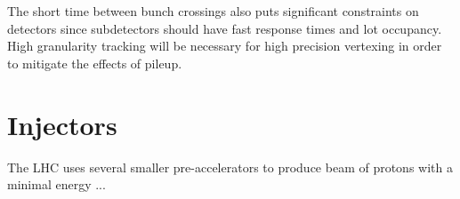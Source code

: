 The short time between bunch crossings also puts significant constraints on 
detectors since subdetectors should have fast response times and lot occupancy. 
High granularity tracking will be necessary for high precision vertexing in
order to mitigate the effects of pileup.




\section{Injectors}
\label{sec:Injectors}

The LHC uses several smaller pre-accelerators to produce beam of protons with 
a minimal energy ...


